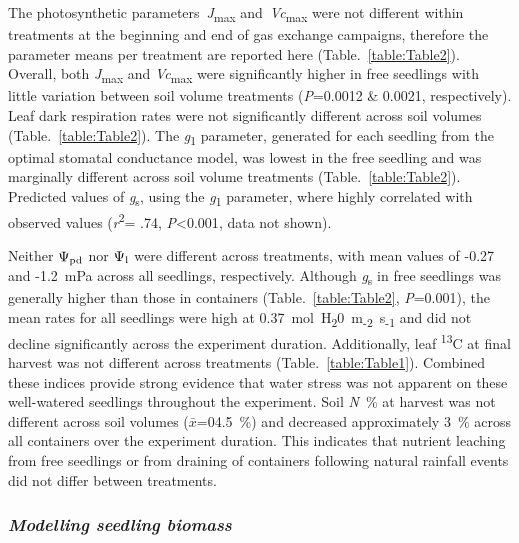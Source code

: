 \documentclass[a4paper]{article}\usepackage[]{graphicx}\usepackage[]{color}
\begin{document}
The photosynthetic parameters~\textit{J}\textsubscript{max} and~\textit{Vc}\textsubscript{max} were not different within treatments at the beginning and end of gas exchange campaigns, therefore the parameter means per treatment are reported here (Table.~\ref{table:Table2}).  Overall, both \textit{J}\textsubscript{max} and \textit{Vc}\textsubscript{max} were significantly higher in free seedlings with little variation between soil volume treatments (\textit{P}=0.0012 \& 0.0021, respectively). Leaf dark respiration rates were not significantly different across soil volumes (Table.~\ref{table:Table2}). The \textit{g}\textsubscript{1} parameter, generated for each seedling from the \citet{medlyn2012reconciling} optimal stomatal conductance model, was lowest in the free seedling and was marginally different across soil volume treatments (Table.~\ref{table:Table2}). Predicted values of \textit{g}\textsubscript{s}, using the \textit{g}\textsubscript{1} parameter, where highly correlated with observed values (\textit{r}\textsuperscript{2}= .74, \textit{P}\textless{0.001}, data not shown).

Neither $\Psi\textsubscript{pd}$ nor $\Psi\textsubscript{l}$ were different across treatments, with mean values of -0.27 and -1.2~mPa across all seedlings, respectively. Although \textit{g}\textsubscript{s} in free seedlings was generally higher than those in containers (Table.~\ref{table:Table2}, \textit{P}=0.001), the mean rates for all seedlings were high at 0.37~mol~H\textsubscript{2}0~m\textsubscript{-2}~s\textsubscript{-1} and did not decline significantly across the experiment duration. Additionally, leaf {\textdelta}\textsuperscript{13}C at final harvest was not different across treatments (Table.~\ref{table:Table1}). Combined these indices provide strong evidence that water stress was not apparent on these well-watered seedlings throughout the experiment. Soil \textit{N}~\% at harvest was not different across soil volumes ($\bar{x}$=04.5~\%) and decreased approximately 3~\% across all containers over the experiment duration. This indicates that nutrient leaching from free seedlings or from draining of containers following natural rainfall events did not differ between treatments. 

\subsubsection*{\textit{Modelling seedling biomass}}
\end{document}
